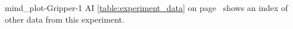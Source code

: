 {\clearpage
  \experimentcausegroupplots{\dataappendixmaxtime}
                            {\dataappendixexperimentonemaxtime}
                            {\dataappendixexperimenttwomaxtime}
                            {\dataappendixexperimentthreemaxtime}
                            {\dataappendixexperimentonename}
                            {\dataappendixexperimenttwoname}
                            {\dataappendixexperimentthreename}
                            {\dataappendixexperimentoneprettyname}
                            {\dataappendixexperimenttwoprettyname}
                            \experimentcausegroupplotscontinued{\dataappendixexperimentthreeprettyname}
                                                               {mind_plot-Gripper-1}
                                                               {AI}
                                                               { {\mbox{\autoref{table:experiment_data}}} on
                                                                 {\mbox{page~\pageref{table:experiment_data}}} shows an index of other data
                                                                 from this experiment.}
}                                                            

